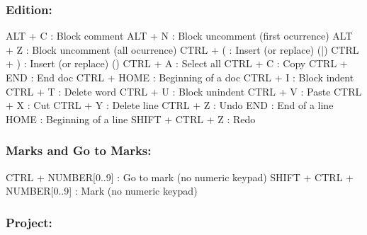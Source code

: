 \subsubsection{Edition:}

\vspace{-0.5cm}
\begin{Rtables}[caption={[Edition keyboard shortcuts]
    Edition keyboard shortcuts},
  label=hotkey:editions]
  ALT   + C               : Block comment
  ALT   + N               : Block uncomment (first ocurrence)
  ALT   + Z               : Block uncomment (all ocurrence)
  CTRL  + (               : Insert (or replace) (|)
  CTRL  + )               : Insert (or replace) ()
  CTRL  + A               : Select all
  CTRL  + C               : Copy
  CTRL  + END             : End doc
  CTRL  + HOME            : Beginning of a doc
  CTRL  + I               : Block indent
  CTRL  + T               : Delete word
  CTRL  + U               : Block unindent
  CTRL  + V               : Paste
  CTRL  + X               : Cut
  CTRL  + Y               : Delete line
  CTRL  + Z               : Undo
  END                     : End of a line
  HOME                    : Beginning of a line
  SHIFT + CTRL + Z        : Redo
\end{Rtables}


\subsubsection{Marks and Go to Marks:}

\vspace{-0.5cm}
\begin{Rtables}[caption={[Marks and go to marks keyboard shortcuts]
    Marks and go to marks keyboard shortcuts},
  label=hotkey:marks]
  CTRL  + NUMBER[0..9]        : Go to mark (no numeric keypad)
  SHIFT + CTRL + NUMBER[0..9] : Mark (no numeric keypad)
\end{Rtables}


\subsubsection{Project:}

